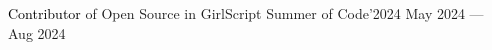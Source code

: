 


{\textcolor{black}{Contributor}} of Open Source in GirlScript Summer of Code'2024 \hfill May 2024 --- Aug 2024


